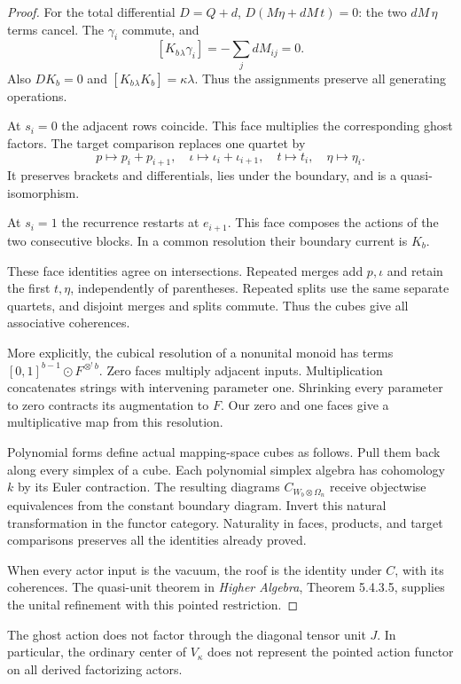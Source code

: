 \begin{proof}
For the total differential $D=Q+d$,
$D(M\eta+dM\,t)=0$: the two $dM\,\eta$ terms cancel.
The $\gamma_i$ commute, and
\[
 [K_b{}_\lambda\gamma_i]=-\sum_jdM_{ij}=0.
\]
Also $DK_b=0$ and $[K_b{}_\lambda K_b]=\kappa\lambda$.
Thus the assignments preserve all generating operations.

At $s_i=0$ the adjacent rows coincide. This face multiplies
the corresponding ghost factors. The target comparison replaces
one quartet by
\[
 p\mapsto p_i+p_{i+1},\quad
 \iota\mapsto\iota_i+\iota_{i+1},\quad
 t\mapsto t_i,\quad\eta\mapsto\eta_i.
\]
It preserves brackets and differentials, lies under the
boundary, and is a quasi-isomorphism.

At $s_i=1$ the recurrence restarts at $e_{i+1}$.
This face composes the actions of the two consecutive blocks.
In a common resolution their boundary current is $K_b$.

These face identities agree on intersections.
Repeated merges add $p,\iota$ and retain the first $t,\eta$,
independently of parentheses. Repeated splits use the same
separate quartets, and disjoint merges and splits commute.
Thus the cubes give all associative coherences.

More explicitly, the cubical resolution of a nonunital monoid
has terms $[0,1]^{b-1}\odot F^{\otimes^!b}$.
Zero faces multiply adjacent inputs. Multiplication concatenates
strings with intervening parameter one. Shrinking every parameter
to zero contracts its augmentation to $F$.
Our zero and one faces give a multiplicative map from this
resolution.

Polynomial forms define actual mapping-space cubes as follows.
Pull them back along every simplex of a cube.
Each polynomial simplex algebra has cohomology $k$ by its
Euler contraction. The resulting diagrams
$C_{W_b\otimes\Omega_n}$ receive objectwise equivalences
from the constant boundary diagram. Invert this natural
transformation in the functor category. Naturality in faces,
products, and target comparisons preserves all the identities
already proved.

When every actor input is the vacuum, the roof is the identity
under $C$, with its coherences. The quasi-unit theorem
in \emph{Higher Algebra}, Theorem 5.4.3.5, supplies the
unital refinement with this pointed restriction.
\end{proof}

\begin{proposition}
\label{v4-arith:centers:prop:ghost-detection}
The ghost action does not factor through the diagonal tensor
unit $J$. In particular, the ordinary center of $V_\kappa$
does not represent the pointed action functor on all derived
factorizing actors.
\end{proposition}

